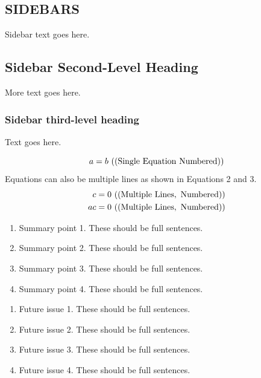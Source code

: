 \documentclass[a4paper]{ar-1col}
\begin{document}
\begin{textbox}[h]\section{SIDEBARS}
Sidebar text goes here.
\subsection{Sidebar Second-Level Heading}
More text goes here.\subsubsection{Sidebar third-level heading}
Text goes here.\end{textbox}



\begin{equation}
a = b \ {\rm ((Single\ Equation\ Numbered))}
\end{equation}
Equations can also be multiple lines as shown in Equations 2 and 3.
\begin{eqnarray}
c = 0 \ {\rm ((Multiple\  Lines, \ Numbered))}\\
ac = 0 \ {\rm ((Multiple \ Lines, \ Numbered))}
\end{eqnarray}

\begin{summary}
\begin{enumerate}
\item Summary point 1. These should be full sentences.
\item Summary point 2. These should be full sentences.
\item Summary point 3. These should be full sentences.
\item Summary point 4. These should be full sentences.
\end{enumerate}
\end{summary}

\begin{issues}
\begin{enumerate}
\item Future issue 1. These should be full sentences.
\item Future issue 2. These should be full sentences.
\item Future issue 3. These should be full sentences.
\item Future issue 4. These should be full sentences.
\end{enumerate}
\end{issues}
\end{document}
